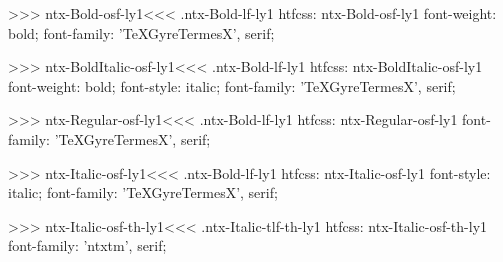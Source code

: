 >>>
\<ntx-Bold-osf-ly1\><<<
.ntx-Bold-lf-ly1
htfcss:  ntx-Bold-osf-ly1  font-weight: bold; font-family: 'TeXGyreTermesX', serif;

>>>
\<ntx-BoldItalic-osf-ly1\><<<
.ntx-Bold-lf-ly1
htfcss:  ntx-BoldItalic-osf-ly1  font-weight: bold; font-style: italic; font-family: 'TeXGyreTermesX', serif;

>>>
\<ntx-Regular-osf-ly1\><<<
.ntx-Bold-lf-ly1
htfcss:  ntx-Regular-osf-ly1  font-family: 'TeXGyreTermesX', serif;

>>>
\<ntx-Italic-osf-ly1\><<<
.ntx-Bold-lf-ly1
htfcss:  ntx-Italic-osf-ly1  font-style: italic; font-family: 'TeXGyreTermesX', serif;

>>>
\<ntx-Italic-osf-th-ly1\><<<
.ntx-Italic-tlf-th-ly1
htfcss:  ntx-Italic-osf-th-ly1  font-family: 'ntxtm', serif;

